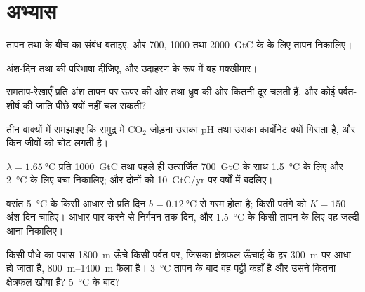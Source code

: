 \section{अभ्यास}

\begin{exercise}[$\star$]\label{exo:b2:global-change:1}
तापन तथा  के बीच का संबंध बताइए, और
700, 1000 तथा \qty{2000}{GtC} के  के लिए
तापन निकालिए।
\end{exercise}

\begin{exercise}[$\star$]\label{exo:b2:global-change:2}
अंश-दिन तथा  की परिभाषा दीजिए, और उदाहरण के रूप में
वह मक्खीमार।
\end{exercise}

\begin{exercise}[$\star$]\label{exo:b2:global-change:3}
समताप-रेखाएँ प्रति अंश तापन पर ऊपर की ओर तथा ध्रुव की ओर कितनी दूर चलती हैं,
और कोई पर्वत-शीर्ष की जाति पीछे क्यों नहीं चल सकती?
\end{exercise}

\begin{exercise}[$\star$]\label{exo:b2:global-change:4}
तीन वाक्यों में समझाइए कि समुद्र में \ensuremath{\mathrm{CO_2}} जोड़ना
उसका pH तथा उसका कार्बोनेट क्यों गिराता है, और किन जीवों को चोट लगती है।
\end{exercise}

\begin{exercise}[$\star\star$]\label{exo:b2:global-change:5}
$\lambda = \qty{1.65}{\celsius}$ प्रति \qty{1000}{GtC} तथा पहले ही
उत्सर्जित \qty{700}{GtC} के साथ \qty{1.5}{\celsius} के लिए और
\qty{2}{\celsius} के लिए बचा  निकालिए; और दोनों को
\qty{10}{GtC/yr} पर वर्षों में बदलिए।
\end{exercise}

\begin{exercise}[$\star\star$]\label{exo:b2:global-change:6}
वसंत \qty{5}{\celsius} के किसी आधार से प्रति दिन $b = \qty{0.12}{\celsius}$
से गरम होता है; किसी पतंगे को $K = 150$ अंश-दिन चाहिए।
आधार पार करने से निर्गमन तक दिन, और \qty{1.5}{\celsius} के किसी
तापन के लिए वह जल्दी आना निकालिए।
\end{exercise}

\begin{exercise}[$\star\star$]\label{exo:b2:global-change:7}
किसी पौधे का परास \qty{1800}{m} ऊँचे किसी पर्वत पर, जिसका क्षेत्रफल ऊँचाई के
हर \qty{300}{m} पर आधा हो जाता है, \qtyrange{800}{1400}{m} फैला है।
\qty{3}{\celsius} तापन के बाद वह पट्टी कहाँ है और उसने कितना
क्षेत्रफल खोया है? \qty{5}{\celsius} के बाद?
\end{exercise}

